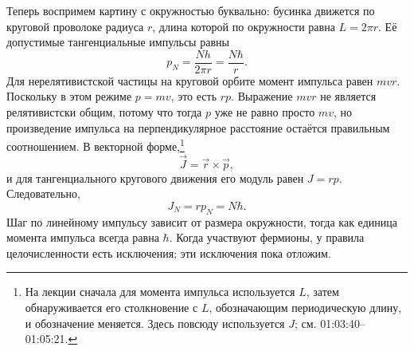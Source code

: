 \begin{classroomqa}
\end{classroomqa}

\begin{classroomqa}
\end{classroomqa}

Теперь воспримем картину с окружностью буквально: бусинка движется по круговой проволоке радиуса \(r\), длина которой по окружности равна \(L=2\pi r\). Её допустимые тангенциальные импульсы равны
\begin{equation}
p_N=\frac{Nh}{2\pi r}=\frac{N\hbar}{r}.
\end{equation}
Для нерелятивистской частицы на круговой орбите момент импульса равен \(mvr\). Поскольку в этом режиме \(p=mv\), это есть \(rp\). Выражение \(mvr\) не является релятивистски общим, потому что тогда \(p\) уже не равно просто \(mv\), но произведение импульса на перпендикулярное расстояние остаётся правильным соотношением. В векторной форме,\footnote{На лекции сначала для момента импульса используется \(L\), затем обнаруживается его столкновение с \(L\), обозначающим периодическую длину, и обозначение меняется. Здесь повсюду используется \(J\); см. 01:03:40--01:05:21.}
\begin{equation}
\vec J=\vec r\times\vec p,
\end{equation}
и для тангенциального кругового движения его модуль равен \(J=rp\). Следовательно,
\begin{equation}
J_N=rp_N=N\hbar.
\end{equation}
Шаг по линейному импульсу зависит от размера окружности, тогда как единица момента импульса всегда равна \(\hbar\). Когда участвуют фермионы, у правила целочисленности есть исключения; эти исключения пока отложим.

